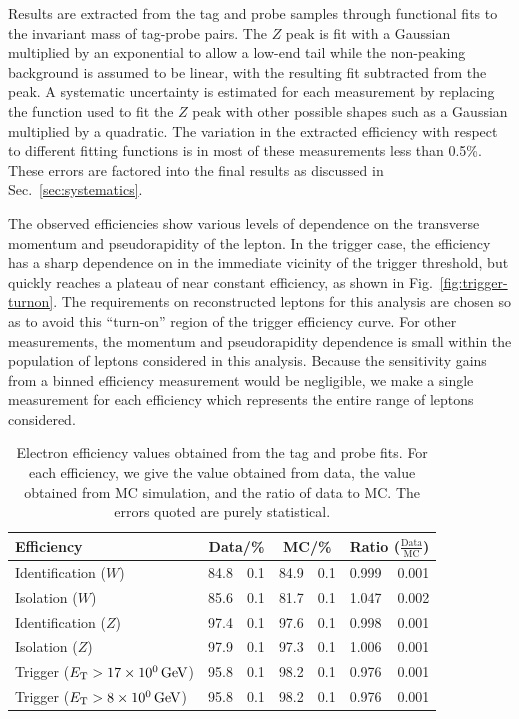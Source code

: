 Results are extracted from the tag and probe samples through functional fits to the invariant mass of tag-probe pairs.  The $Z$ peak is fit with a Gaussian multiplied by an exponential to allow a low-end tail while the non-peaking background is assumed to be linear, with the resulting fit subtracted from the peak.  A systematic uncertainty is estimated for each measurement by replacing the function used to fit the $Z$ peak with other possible shapes such as a Gaussian multiplied by a quadratic.  The variation in the extracted efficiency with respect to different fitting functions is in most of these measurements less than 0.5\%.  These errors are factored into the final results as discussed in Sec.~\ref{sec:systematics}.

The observed efficiencies show various levels of dependence on the transverse momentum and pseudorapidity of the lepton.  In the trigger case, the efficiency has a sharp dependence on \pt in the immediate vicinity of the trigger threshold, but quickly reaches a plateau of near constant efficiency, as shown in Fig.~\ref{fig:trigger-turnon}.  The \pt requirements on reconstructed leptons for this analysis are chosen so as to avoid this ``turn-on'' region of the trigger efficiency curve.  For other measurements, the momentum and pseudorapidity dependence is small within the population of leptons considered in this analysis.  Because the sensitivity gains from a binned efficiency measurement would be negligible, we make a single measurement for each efficiency which represents the entire range of leptons considered.

\begin{table}[p]
  \newcommand{\sep}{$\,\pm\,$}
  \centering
  \begin{tabular}{l l@{\sep}r l@{\sep}r l@{\sep}r}
    \toprule
    Efficiency & \multicolumn{2}{c}{Data/\%} & \multicolumn{2}{c}{MC/\%} & \multicolumn{2}{c}{Ratio ($\frac{\text{Data}}{\text{MC}}$)} \\
    \midrule
    Identification \hfill($W$) & 84.8&0.1 & 84.9&0.1 & 0.999&0.001 \\
    Isolation \hfill($W$)      & 85.6&0.1 & 81.7&0.1 & 1.047&0.002 \\
    Identification \hfill($Z$) & 97.4&0.1 & 97.6&0.1 & 0.998&0.001 \\
    Isolation \hfill($Z$)      & 97.9&0.1 & 97.3&0.1 & 1.006&0.001 \\
    Trigger \hfill($\et > \sienergy{17}$) & 95.8&0.1 & 98.2&0.1 & 0.976&0.001 \\
    Trigger \hfill($\et > \sienergy{08}$) & 95.8&0.1 & 98.2&0.1 & 0.976&0.001 \\
    \bottomrule
  \end{tabular}
  \caption[Electron efficiency values obtained from the tag and probe
fits]{Electron efficiency values obtained from the tag and probe
fits.  For each efficiency, we give the value obtained from data, the
value obtained from MC simulation, and the ratio of data to MC.  The
errors quoted are purely statistical.}
\label{tab:electron-efficiencies}
\end{table}


